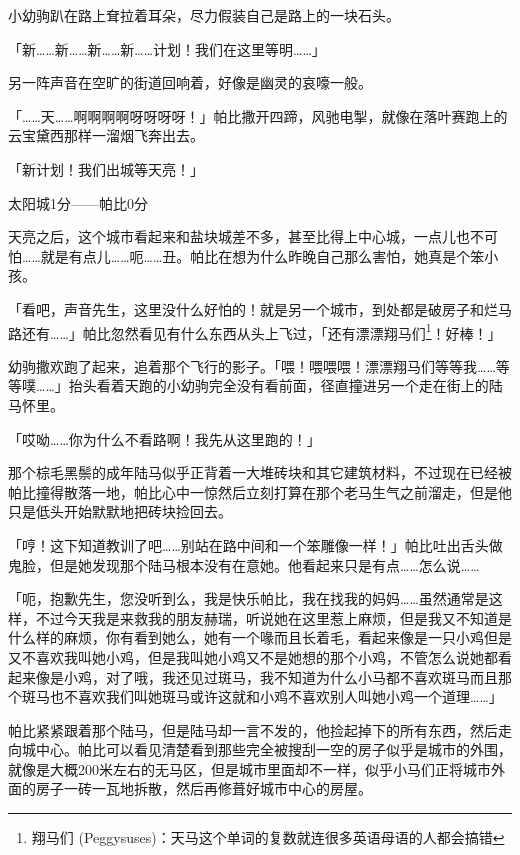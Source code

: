 小幼驹趴在路上耷拉着耳朵，尽力假装自己是路上的一块石头。

「新……新……新……新……计划！我们在这里等明……」

另一阵声音在空旷的街道回响着，好像是幽灵的哀嚎一般。

「……天……啊啊啊啊呀呀呀呀！」帕比撒开四蹄，风驰电掣，就像在落叶赛跑上的云宝黛西那样一溜烟飞奔出去。

「新计划！我们出城等天亮！」

\begin{center}
太阳城1分——帕比0分
\end{center}

\horizonline


天亮之后，这个城市看起来和盐块城差不多，甚至比得上中心城，一点儿也不可怕……就是有点儿……呃……丑。帕比在想为什么昨晚自己那么害怕，她真是个笨小孩。

「看吧，声音先生，这里没什么好怕的！就是另一个城市，到处都是破房子和烂马路还有……」帕比忽然看见有什么东西从头上飞过，「还有漂漂翔马们\footnote{翔马们 (Peggysuses)：天马这个单词的复数就连很多英语母语的人都会搞错}！好棒！」

幼驹撒欢跑了起来，追着那个飞行的影子。「喂！喂喂喂！漂漂翔马们等等我……等等噗……」抬头看着天跑的小幼驹完全没有看前面，径直撞进另一个走在街上的陆马怀里。

「哎呦……你为什么不看路啊！我先从这里跑的！」

那个棕毛黑鬃的成年陆马似乎正背着一大堆砖块和其它建筑材料，不过现在已经被帕比撞得散落一地，帕比心中一惊然后立刻打算在那个老马生气之前溜走，但是他只是低头开始默默地把砖块捡回去。

「哼！这下知道教训了吧……别站在路中间和一个笨雕像一样！」帕比吐出舌头做鬼脸，但是她发现那个陆马根本没有在意她。他看起来只是有点……怎么说……

「呃，抱歉先生，您没听到么，我是快乐帕比，我在找我的妈妈……虽然通常是这样，不过今天我是来救我的朋友赫瑞，听说她在这里惹上麻烦，但是我又不知道是什么样的麻烦，你有看到她么，她有一个喙而且长着毛，看起来像是一只小鸡但是又不喜欢我叫她小鸡，但是我叫她小鸡又不是她想的那个小鸡，不管怎么说她都看起来像是小鸡，对了哦，我还见过斑马，我不知道为什么小马都不喜欢斑马而且那个斑马也不喜欢我们叫她斑马或许这就和小鸡不喜欢别人叫她小鸡一个道理……」

帕比紧紧跟着那个陆马，但是陆马却一言不发的，他捡起掉下的所有东西，然后走向城中心。帕比可以看见清楚看到那些完全被搜刮一空的房子似乎是城市的外围，就像是大概200米左右的无马区，但是城市里面却不一样，似乎小马们正将城市外面的房子一砖一瓦地拆散，然后再修葺好城市中心的房屋。

